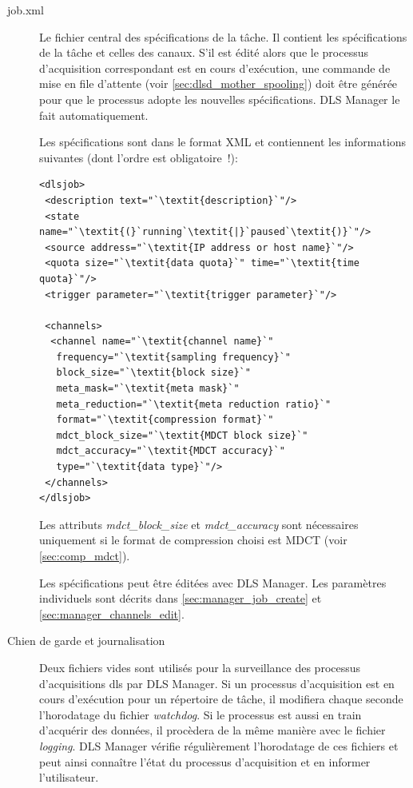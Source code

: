 \documentclass[a4paper,12pt,BCOR6mm,bibtotoc,idxtotoc]{scrbook}
\begin{document}
\begin{description}

\item[job.xml]
  Le fichier central des sp\'ecifications de la t\^ache.  Il contient
  les sp\'ecifications de la t\^ache et celles des canaux.  S'il est
  \'edit\'e alors que le processus d'acquisition correspondant est en
  cours d'ex\'ecution, une commande de mise en file d'attente (voir
  \autoref{sec:dlsd_mother_spooling}) doit \^etre g\'en\'er\'ee pour
  que le processus adopte les nouvelles sp\'ecifications. DLS Manager
  le fait automatiquement.

  Les sp\'ecifications sont dans le format XML et contiennent les informations suivantes
  (dont l'ordre est obligatoire~!):

\begin{lstlisting}
<dlsjob>
 <description text="`\textit{description}`"/>
 <state name="`\textit{(}`running`\textit{|}`paused`\textit{)}`"/>
 <source address="`\textit{IP address or host name}`"/>
 <quota size="`\textit{data quota}`" time="`\textit{time quota}`"/>
 <trigger parameter="`\textit{trigger parameter}`"/>

 <channels>
  <channel name="`\textit{channel name}`"
   frequency="`\textit{sampling frequency}`"
   block_size="`\textit{block size}`"
   meta_mask="`\textit{meta mask}`"
   meta_reduction="`\textit{meta reduction ratio}`"
   format="`\textit{compression format}`"
   mdct_block_size="`\textit{MDCT block size}`"
   mdct_accuracy="`\textit{MDCT accuracy}`"
   type="`\textit{data type}`"/>
 </channels>
</dlsjob>
\end{lstlisting}

Les attributs \textit{mdct\_block\_size} et \textit{mdct\_accuracy} sont
n\'ecessaires uniquement si le format de compression choisi est
MDCT (voir \autoref{sec:comp_mdct}).

Les sp\'ecifications peut \^etre \'edit\'ees avec DLS Manager. Les param\`etres
individuels sont d\'ecrits dans \autoref{sec:manager_job_create} et
\autoref{sec:manager_channels_edit}.

\item[Chien de garde et journalisation]
  Deux fichiers vides sont utilis\'es pour la surveillance des
  processus d'acquisitions dls par DLS Manager. Si un processus
  d'acquisition est en cours d'ex\'ecution pour un r\'epertoire de
  t\^ache, il modifiera chaque seconde l'horodatage du fichier
  \textit{watchdog}.  Si le processus est aussi en train d'acqu\'erir
  des donn\'ees, il proc\`edera de la m\^eme mani\`ere avec le fichier
  \textit{logging}.  DLS Manager v\'erifie r\'eguli\`erement
  l'horodatage de ces fichiers et peut ainsi conna\^itre l'\'etat du
  processus d'acquisition et en informer l'utilisateur.



\end{description}
\end{document}
